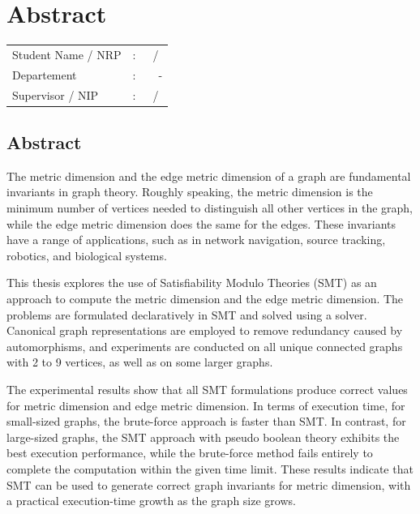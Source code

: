 \chapter*{Abstract}

\noindent
\begin{center}
	\begin{minipage}{0.9\linewidth}
		\centering
		\textbf{\MakeUppercase{\titleEnglish}}
	\end{minipage}
\end{center}

\vspace{2em}

\noindent
\begin{center}
	\renewcommand{\arraystretch}{1.25}
	\begin{tabularx}{0.75\linewidth}{@{}l@{\ }l@{\enspace}X}
		Student Name / NRP &:& \theAuthor\ / \theAuthorId \\
		Departement &:& \departmentNameHeadlessEnglish\ \facultyNameEnglishAbbreviated\ - \campusNameAbbreviated \\
		Supervisor / NIP &:& \supervisor\ / \supervisorId
	\end{tabularx}
\end{center}

\vspace{1em}

\section*{Abstract}

The metric dimension and the edge metric dimension of a graph are fundamental invariants in graph theory. Roughly speaking, the metric dimension is the minimum number of vertices needed to distinguish all other vertices in the graph, while the edge metric dimension does the same for the edges. These invariants have a range of applications, such as in network navigation, source tracking, robotics, and biological systems.

This thesis explores the use of Satisfiability Modulo Theories (SMT) as an approach to compute the metric dimension and the edge metric dimension. The problems are formulated declaratively in SMT and solved using a solver. Canonical graph representations are employed to remove redundancy caused by automorphisms, and experiments are conducted on all unique connected graphs with 2 to 9 vertices, as well as on some larger graphs.

The experimental results show that all SMT formulations produce correct values for metric dimension and edge metric dimension. In terms of execution time, for small-sized graphs, the brute-force approach is faster than SMT. In contrast, for large-sized graphs, the SMT approach with pseudo boolean theory exhibits the best execution performance, while the brute-force method fails entirely to complete the computation within the given time limit. These results indicate that SMT can be used to generate correct graph invariants for metric dimension, with a practical execution-time growth as the graph size grows.

